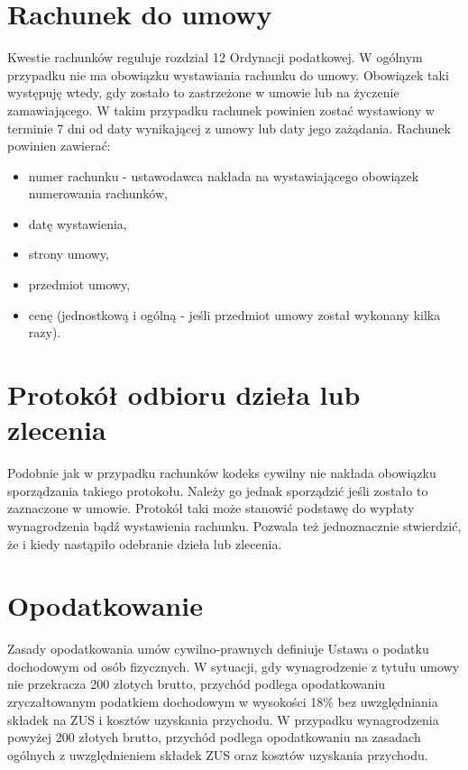 \section[Rachunek do umowy][Rachunek do umowy]{Rachunek do umowy}
Kwestie rachunków reguluje rozdział 12 Ordynacji podatkowej\cite{ordynacjaPodatkowa}. W ogólnym przypadku nie ma obowiązku wystawiania rachunku do umowy. Obowiązek taki występuję wtedy, gdy zostało to zastrzeżone w umowie lub na życzenie zamawiającego. W takim przypadku rachunek powinien zostać wystawiony w terminie 7 dni od daty wynikającej z umowy lub daty jego zażądania. Rachunek powinien zawierać:
\begin{itemize}
\item numer rachunku - ustawodawca nakłada na wystawiającego obowiązek numerowania rachunków,
\item datę wystawienia,
\item strony umowy,
\item przedmiot umowy,
\item cenę (jednostkową i ogólną - jeśli przedmiot umowy został wykonany kilka razy).
\end{itemize}

\section[Protokół odbioru dzieła lub zlecenia][Protokół odbioru dzieła lub zlecenia]{Protokół odbioru dzieła lub zlecenia}
Podobnie jak w przypadku rachunków kodeks cywilny nie nakłada obowiązku sporządzania takiego protokołu. Należy go jednak sporządzić jeśli zostało to zaznaczone w umowie. Protokół taki może stanowić podstawę do wypłaty wynagrodzenia bądź wystawienia rachunku. Pozwala też jednoznacznie stwierdzić, że i kiedy nastąpiło odebranie dzieła lub zlecenia.

\section[Opodatkowanie][Opodatkowanie]{Opodatkowanie}
Zasady opodatkowania umów cywilno-prawnych definiuje Ustawa o podatku dochodowym od osób fizycznych\cite{ustawaOPodatkuDochodowym}. W sytuacji, gdy wynagrodzenie z tytułu umowy nie przekracza 200 złotych brutto, przychód podlega opodatkowaniu zryczałtowanym podatkiem dochodowym w wysokości 18\% bez uwzględniania składek na ZUS i kosztów uzyskania przychodu.
W przypadku wynagrodzenia powyżej 200 złotych brutto, przychód podlega opodatkowaniu na zasadach ogólnych z uwzględnieniem składek ZUS oraz kosztów uzyskania przychodu.

